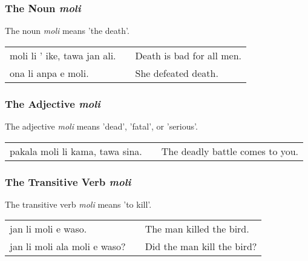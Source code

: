 %
%
\subsubsection*{The Noun \textit{moli}}
%
%

The noun \textit{moli} means 'the death'.

\begin{supertabular}{p{5,5cm}|ll}
moli li ' ike, tawa jan ali. && Death is bad for all men. \\
ona li anpa e moli. && She defeated death.  \\
\end{supertabular} 

%
%
\subsubsection*{The Adjective \textit{moli}}
%
%

The adjective \textit{moli} means 'dead', 'fatal', or 'serious'. 

\begin{supertabular}{p{5,5cm}|ll}
pakala moli li kama, tawa sina. && The deadly battle comes to you. \\
\end{supertabular} 

%
%
\subsubsection*{The Transitive Verb \textit{moli}}
%
%
The transitive verb \textit{moli} means 'to kill'.

\begin{supertabular}{p{5,5cm}|ll}
jan li moli e waso. && The man killed the bird. \\
jan li moli ala moli e waso? && Did the man kill the bird? \\
\end{supertabular} 

%
%
